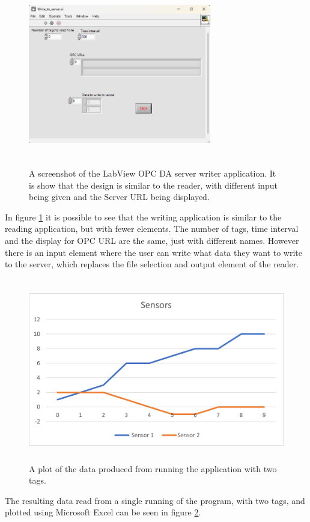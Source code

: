 \documentclass[11pt, A4paper, english]{article}
\begin{document}
				\begin{figure}
\includegraphics[width=8cm, height=8cm]{Labview OPC DA/builds/Write to server/Write_Screenshot.png}
\caption{A screenshot of the LabView OPC DA server writer application. It is show that the design is similar to the reader, with different input being given and the Server URL being displayed.}
\label{im:L_DA_W}
				\end{figure}
In figure \ref{im:L_DA_W} it is possible to see that the writing application is similar to the reading application, but with fewer elements. The number of tags, time interval and the display for OPC URL are the same, just with different names. However there is an input element where the user can write what data they want to write to the server, which replaces the file selection and output element of the reader. \\
				\begin{figure}[H]
\includegraphics[width=12.8cm, height=8cm]{Labview OPC DA/Sensors graph.png}
\caption{A plot of the data produced from running the application with two tags.}
\label{im:L_DA_D}
				\end{figure}
The resulting data read from a single running of the program, with two tags,  and plotted using Microsoft Excel can be seen in figure \ref{im:L_DA_D}.
\end{document}
